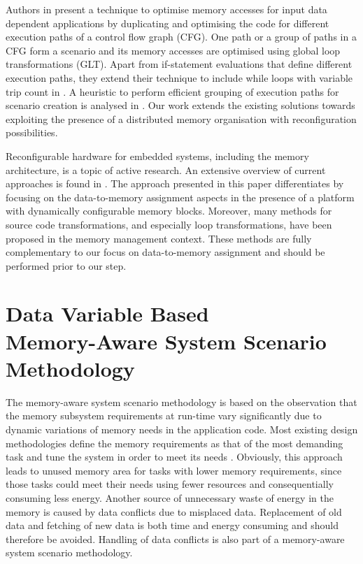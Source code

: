 \documentclass[a4paper,conference]{IEEEtran}
\begin{document}
Authors in \cite{Pal06} present a technique to optimise memory accesses for input data dependent applications by duplicating and optimising the code for different execution paths of a control flow graph (CFG). One path or a group of paths in a CFG form a scenario and its memory accesses are optimised using global loop transformations (GLT). Apart from if-statement evaluations that define different execution paths, they extend their technique to include while loops with variable trip count in \cite{Pal06b}. A heuristic to perform efficient grouping of execution paths for scenario creation is analysed in \cite{Pal07}. Our work extends the existing solutions towards exploiting the presence of a distributed memory organisation with reconfiguration possibilities.

Reconfigurable hardware for embedded systems, including the memory architecture, is a topic of active research. An extensive overview of current approaches is found in \cite{Garcia}. The approach presented in this paper differentiates by focusing on the data-to-memory assignment aspects in the presence of a platform with dynamically configurable memory blocks. Moreover, many methods for source code transformations, and especially loop transformations, have been proposed in the memory management context. These methods are fully complementary to our focus on data-to-memory assignment and should be performed prior to our step. 

\section{Data Variable Based \\ Memory-Aware System Scenario Methodology}
\label{sec:methodology}

The memory-aware system scenario methodology is based on the observation that the memory subsystem requirements at run-time vary significantly due to dynamic variations of memory needs in the application code. Most existing design methodologies define the memory requirements as that of the most demanding task and tune the system in order to meet its needs \cite{tcm}. Obviously, this approach leads to unused memory area for tasks with lower memory requirements, since those tasks could meet their needs using fewer resources and consequentially consuming less energy. Another source of unnecessary waste of energy in the memory is caused by data conflicts due to misplaced data. Replacement of old data and fetching of new data is both time and energy consuming and should therefore be avoided. Handling of data conflicts is also part of a memory-aware system scenario methodology.
\end{document}
